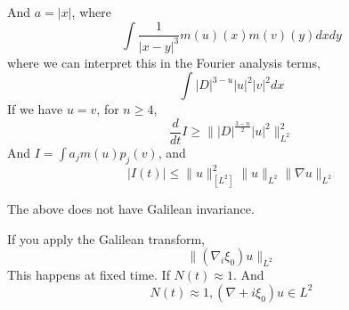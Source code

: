 And $a=|x|$, where 
\begin{equation*}
    \int\frac{1}{|x-y|^3}m(u)(x)m(v)(y)dxdy
\end{equation*}
where we can interpret this in the Fourier analysis terms, 
\begin{equation*}
    \int |D|^{3-u}|u|^2|v|^2dx
\end{equation*}
If we have $u=v$, for $n\geq 4$, 
\begin{equation*}
    \frac{d}{dt}I\geq\||D|^\frac{3-n}{2}|u|^2\|_{L^2}^2
\end{equation*}
And $I=\int a_jm(u)p_j(v)$, and 
\begin{equation*}
    |I(t)|\leq\|u\|_[L^2]^2\|u\|_{L^2}\|\nabla u\|_{L^2}
\end{equation*}
\begin{note}
    The above does not have Galilean invariance.
\end{note}
If you apply the Galilean transform, 
\begin{equation*}
    \|(\nabla _i\xi_0)u\|_{L^2}
\end{equation*}
This happens at fixed time. If $N(t)\approx 1$. And 
\begin{equation*}
    N(t)\approx 1, (\nabla +i\xi_0)u\in L^2
\end{equation*}
